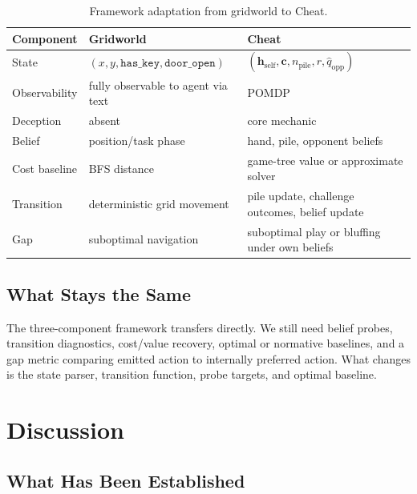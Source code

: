 \documentclass[11pt,a4paper]{article}
\newcommand{\qhat}{\hat q}
\begin{document}
\begin{table}[h]
\centering
\small
\begin{tabularx}{\linewidth}{lll}
\toprule
Component & Gridworld & Cheat \\
\midrule
State & $(x,y,\texttt{has\_key},\texttt{door\_open})$ & $(\mathbf{h}_{\mathrm{self}},\mathbf{c},n_{\mathrm{pile}},r,\qhat_{\mathrm{opp}})$ \\
Observability & fully observable to agent via text & POMDP \\
Deception & absent & core mechanic \\
Belief & position/task phase & hand, pile, opponent beliefs \\
Cost baseline & BFS distance & game-tree value or approximate solver \\
Transition & deterministic grid movement & pile update, challenge outcomes, belief update \\
Gap & suboptimal navigation & suboptimal play or bluffing under own beliefs \\
\bottomrule
\end{tabularx}
\caption{Framework adaptation from gridworld to Cheat.}
\end{table}

\subsection{What Stays the Same}

The three-component framework transfers directly. We still need belief probes, transition diagnostics, cost/value recovery, optimal or normative baselines, and a gap metric comparing emitted action to internally preferred action. What changes is the state parser, transition function, probe targets, and optimal baseline.

\section{Discussion}

\subsection{What Has Been Established}
\end{document}
